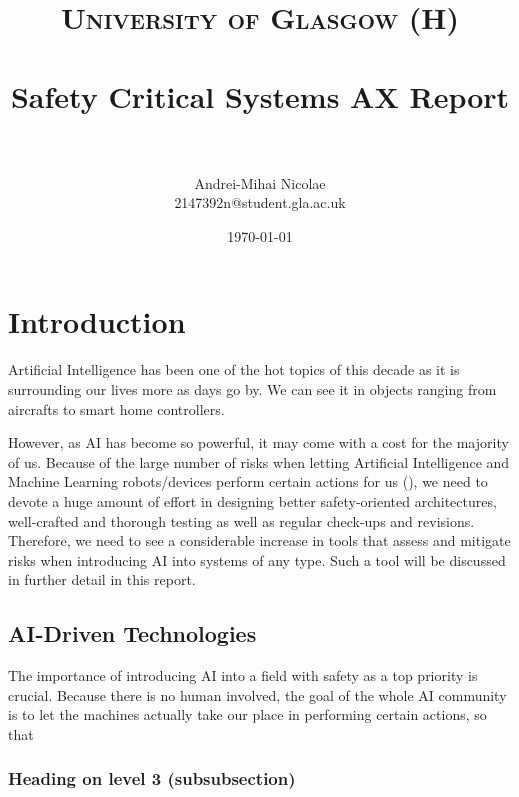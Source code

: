 \documentclass[paper=a4, fontsize=11pt]{scrartcl} %
\title{
\normalfont \normalsize
\textsc{University of Glasgow (H)} \\ [25pt] 
\horrule{0.5pt} \\[0.4cm] %
\huge Safety Critical Systems AX Report \\ 
\horrule{2pt} \\[0.5cm] %
}
\author{Andrei-Mihai Nicolae\\2147392n@student.gla.ac.uk} %
\date{\normalsize\today} %
\numberwithin{equation}{section} %
\numberwithin{figure}{section} %
\numberwithin{table}{section} %
\begin{document}
\maketitle %

\tableofcontents %


\section{Introduction}

\par
Artificial Intelligence has been one of the hot topics of this decade as it is surrounding our lives more as days go by. We can see it in objects ranging from aircrafts to smart home controllers.

However, as AI has become so powerful, it may come with a cost for the majority of us. Because of the large number of risks when letting Artificial Intelligence and Machine Learning robots/devices perform certain actions for us (\cite{ai-risks}), we need to devote a huge amount of effort in designing better safety-oriented architectures, well-crafted and thorough testing as well as regular check-ups and revisions. Therefore, we need to see a considerable increase in tools that assess and mitigate risks when introducing AI into systems of any type. Such a tool will be discussed in further detail in this report.


\subsection{AI-Driven Technologies}

\par
The importance of introducing AI into a field with safety as a top priority is crucial. Because there is no human involved, the goal of the whole AI community is to let the machines actually take our place in performing certain actions, so that 




\subsubsection{Heading on level 3 (subsubsection)}
\end{document}
